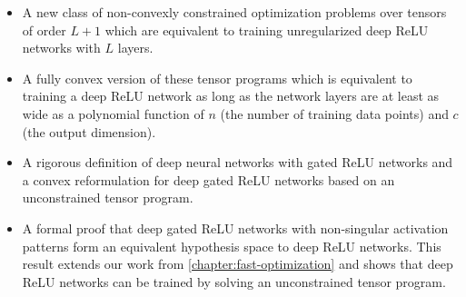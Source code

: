 \begin{itemize}
    \item A new class of non-convexly constrained optimization problems over
          tensors of order \( L+1 \) which are equivalent to training
          unregularized deep ReLU networks with \( L \) layers.

    \item A fully convex version of these tensor programs which is equivalent
          to training a deep ReLU network as long as the network layers
          are at least as wide as a polynomial function of \( n \) (the number of training
          data points) and \( c \) (the output dimension).

    \item A rigorous definition of deep neural networks with gated ReLU networks
          and a convex reformulation for deep gated ReLU networks
          based on an unconstrained tensor program.

    \item A formal proof that deep gated ReLU networks with non-singular
          activation patterns form an equivalent hypothesis space to deep
          ReLU networks.
          This result extends our work from
          \cref{chapter:fast-optimization} and shows that deep ReLU networks
          can be trained by solving an unconstrained tensor program.
\end{itemize}

